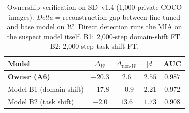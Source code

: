 \begin{table}[t]
\caption{Ownership verification on SD~v1.4 (1{,}000 private COCO images).
\emph{Delta} = reconstruction gap between fine-tuned and base model on $\mathcal{W}$.
Direct detection runs the MIA on the suspect model itself.
B1: 2{,}000-step domain-shift FT. B2: 2{,}000-step task-shift FT.}
\label{tab:sd_verification}
\centering
\small
\begin{tabular}{@{}lcccc@{}}
\toprule
Model & $\bar\Delta_{\mathcal{W}}$ & $\bar\Delta_{\text{non-}\mathcal{W}}$ & $|d|$ & AUC \\
\midrule
\textbf{Owner (A6)} & $-20.3$ & $2.6$ & $2.55$ & $0.987$ \\
Model B1 (domain shift) & $-17.8$ & $-0.9$ & $2.21$ & $0.972$ \\
Model B2 (task shift) & $-2.0$ & $13.6$ & $1.73$ & $0.908$ \\
\bottomrule
\end{tabular}
\end{table}